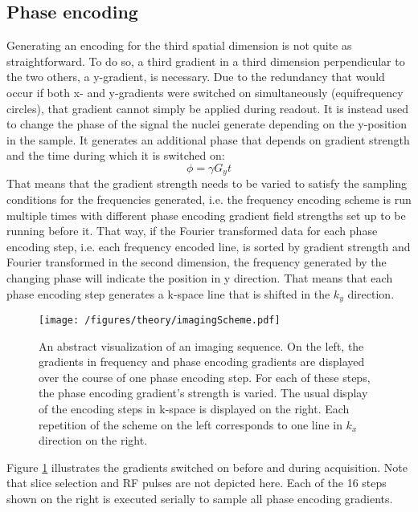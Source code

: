         \subsection{Phase encoding}
            Generating an encoding for the third spatial dimension is not quite as straightforward.  To do so, a third gradient in a third dimension perpendicular to the two others, a y-gradient, is necessary.  Due to the redundancy that would occur if both x- and y-gradients were switched on simultaneously (equifrequency circles), that gradient cannot simply be applied during readout. It is instead used to change the phase of the signal the nuclei generate depending on the y-position in the sample. It generates an additional phase that depends on gradient strength and the time during which it is switched on:
            \begin{equation}
                \phi = \gamma G_y t
            \end{equation}
            That means that the gradient strength needs to be varied to satisfy the sampling conditions for the frequencies generated, i.e. the frequency encoding scheme is run multiple times with different phase encoding gradient field strengths set up to be running before it. That way, if the Fourier transformed data for each phase encoding step, i.e. each frequency encoded line, is sorted by gradient strength and Fourier transformed in the second dimension, the frequency generated by the changing phase will indicate the position in y direction. That means that each phase encoding step generates a k-space line that is shifted in the $k_y$ direction.
            \begin{figure}
                \texttt{[image: /figures/theory/imagingScheme.pdf]}
                \centering
                \caption[k-space Graph]{An abstract visualization of an imaging sequence. On the left, the gradients in frequency and phase encoding gradients are displayed over the course of one phase encoding step. For each of these steps, the phase encoding gradient's strength is varied. The usual display of the encoding steps in k-space is displayed on the right. Each repetition of the scheme on the left corresponds to one line in $k_x$ direction on the right.}
                \label{figure:theory:MRIScheme}
            \end{figure}
            Figure \ref{figure:theory:MRIScheme} illustrates the gradients switched on before and during acquisition. Note that slice selection and RF pulses are not depicted here. Each of the 16 steps shown on the right is executed serially to sample all phase encoding gradients.
